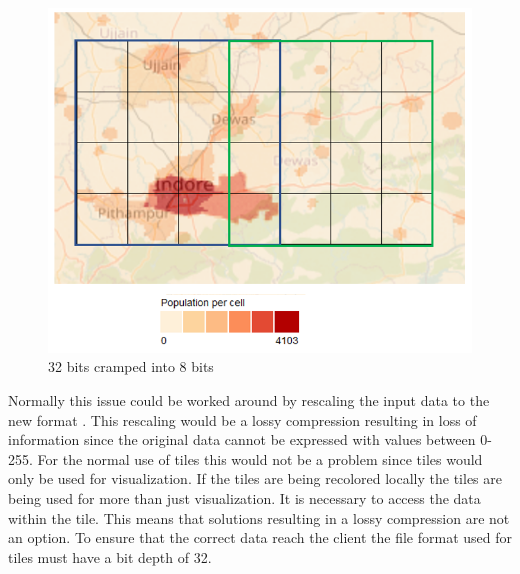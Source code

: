 \begin{figure} [H]
	\centering
	\includegraphics[width=.8\textwidth]{Pictures/WhyColorLocallyMap}
	\caption{32 bits cramped into 8 bits}
	\label{WhyColorLocallyMap}
\end{figure}

Normally this issue could be worked around by rescaling the input data to the new format \citep{gdal2tilesDoc} . This rescaling would be a lossy compression resulting in loss of information since the original data cannot be expressed with values between 0-255. \citep{dent}
For the normal use of tiles this would not be a problem since tiles would only be used for visualization. 
If the tiles are being recolored locally the tiles are being used for more than just visualization. It is necessary to access the data within the tile. This means that solutions resulting in a lossy compression are not an option. To ensure that the correct data reach the client the file format used for tiles must have a bit depth of 32.